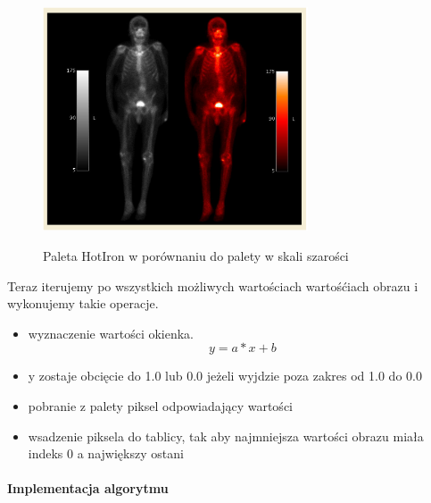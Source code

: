 \begin{figure}[!htbp]
    \caption{Paleta HotIron w porównaniu do palety w skali szarości}
    \includegraphics[width=0.7\textwidth]{img/monochrome-001.png}
    \centering
    \label{fig:monochrome1}
\end{figure}

Teraz iterujemy po wszystkich możliwych wartościach wartośćiach obrazu i wykonujemy takie operacje.
\begin{itemize}
    \item wyznaczenie wartości okienka.
          \[y = a * x + b\]
    \item y zostaje obcięcie do 1.0 lub 0.0 jeżeli wyjdzie poza zakres od 1.0 do 0.0
    \item pobranie z palety piksel odpowiadający wartości
    \item wsadzenie piksela do tablicy, tak aby najmniejsza wartości obrazu miała indeks 0 a największy ostani
\end{itemize}


\paragraph{Implementacja algorytmu}

